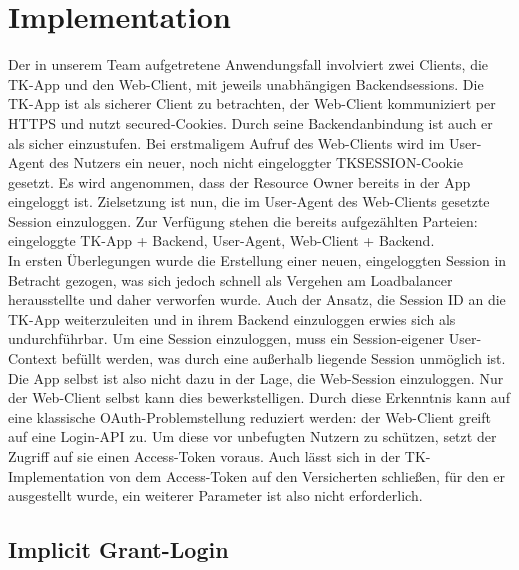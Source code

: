 \chapter{Implementation} Der in unserem Team aufgetretene Anwendungsfall
involviert zwei Clients, die TK-App und den Web-Client, mit jeweils unabhängigen
Backendsessions. Die TK-App ist als sicherer Client zu betrachten, der
Web-Client kommuniziert per HTTPS und nutzt secured-Cookies. Durch seine
Backendanbindung ist auch er als sicher einzustufen. Bei erstmaligem Aufruf des
Web-Clients wird im User-Agent des Nutzers ein neuer, noch nicht eingeloggter
TKSESSION-Cookie gesetzt. Es wird angenommen, dass der Resource Owner bereits in
der App eingeloggt ist. Zielsetzung ist nun, die im User-Agent des Web-Clients
gesetzte Session einzuloggen. Zur Verfügung stehen die bereits aufgezählten
Parteien: eingeloggte TK-App + Backend, User-Agent, Web-Client + Backend.
\\
In ersten Überlegungen wurde die Erstellung einer neuen, eingeloggten Session
in Betracht gezogen, was sich jedoch schnell als Vergehen am Loadbalancer
herausstellte und daher verworfen wurde. Auch der Ansatz, die Session ID an die
TK-App weiterzuleiten und in ihrem Backend einzuloggen erwies sich als
undurchführbar. Um eine Session einzuloggen, muss ein Session-eigener
User-Context befüllt werden, was durch eine außerhalb liegende Session unmöglich
ist. 
\\
Die App selbst ist also nicht dazu in der Lage, die Web-Session einzuloggen.
Nur der Web-Client selbst kann dies bewerkstelligen. Durch diese Erkenntnis kann
auf eine klassische \gls{OAuth}-Problemstellung reduziert werden: der Web-Client
greift auf eine Login-API zu. Um diese vor unbefugten Nutzern zu schützen,
setzt der Zugriff auf sie einen Access-Token voraus. Auch lässt sich in der TK-
Implementation von dem Access-Token auf den Versicherten schließen, für den er
ausgestellt wurde, ein weiterer Parameter ist also nicht erforderlich.
\section{Implicit Grant-Login}

